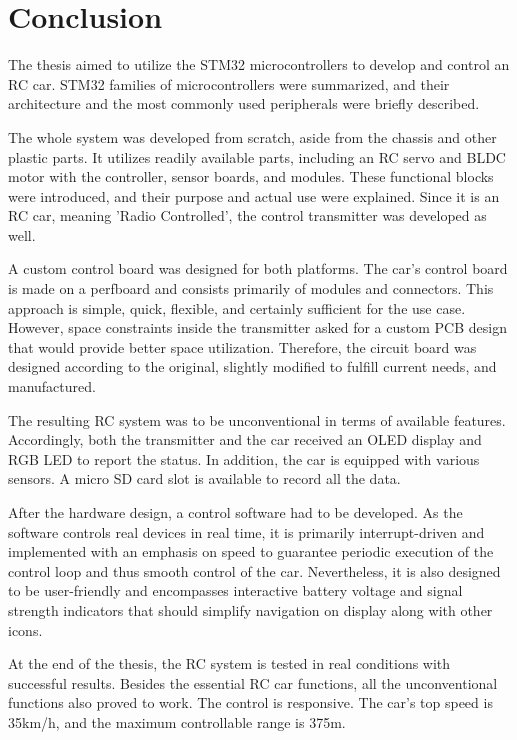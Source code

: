 


\part{Conclusion}
\label{chap:conclusion}
The thesis aimed to utilize the STM32 microcontrollers to develop and control an RC car. STM32 families of microcontrollers were summarized, and their architecture and the most commonly used peripherals were briefly described.

The whole system was developed from scratch, aside from the chassis and other plastic parts. It utilizes readily available parts, including an RC servo and BLDC motor with the controller, sensor boards, and modules. These functional blocks were introduced, and their purpose and actual use were explained. Since it is an RC car, meaning 'Radio Controlled', the control transmitter was developed as well.

A custom control board was designed for both platforms. The car's control board is made on a perfboard and consists primarily of modules and connectors. This approach is simple, quick, flexible, and certainly sufficient for the use case. However, space constraints inside the transmitter asked for a custom PCB design that would provide better space utilization. Therefore, the circuit board was designed according to the original, slightly modified to fulfill current needs, and manufactured.

The resulting RC system was to be unconventional in terms of available features. Accordingly, both the transmitter and the car received an OLED display and RGB LED to report the status. In addition, the car is equipped with various sensors. A micro SD card slot is available to record all the data.

After the hardware design, a control software had to be developed. As the software controls real devices in real time, it is primarily interrupt-driven and implemented with an emphasis on speed to guarantee periodic execution of the control loop and thus smooth control of the car. Nevertheless, it is also designed to be user-friendly and encompasses interactive battery voltage and signal strength indicators that should simplify navigation on display along with other icons.

At the end of the thesis, the RC system is tested in real conditions with successful results. Besides the essential RC car functions, all the unconventional functions also proved to work. The control is responsive. The car's top speed is 35km/h, and the maximum controllable range is 375m.

